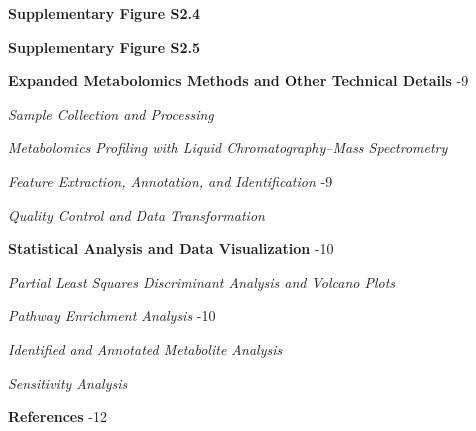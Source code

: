 \documentclass[
]{article}
\begin{document}
\textbf{Supplementary Figure S2.4} 

\textbf{Supplementary Figure S2.5} 

\textbf{Expanded Metabolomics Methods and Other Technical Details}
-9

\quad \textit{Sample Collection and Processing} 

\quad \textit{Metabolomics Profiling with Liquid Chromatography--Mass Spectrometry}

\quad \textit{Feature Extraction, Annotation, and Identification}
-9

\quad \textit{Quality Control and Data Transformation} 

\textbf{Statistical Analysis and Data Visualization} -10

\quad \textit{Partial Least Squares Discriminant Analysis and Volcano Plots}

\quad \textit{Pathway Enrichment Analysis} -10

\quad \textit{Identified and Annotated Metabolite Analysis} 

\quad \textit{Sensitivity Analysis} 

\textbf{References} -12

\newpage








\end{document}
